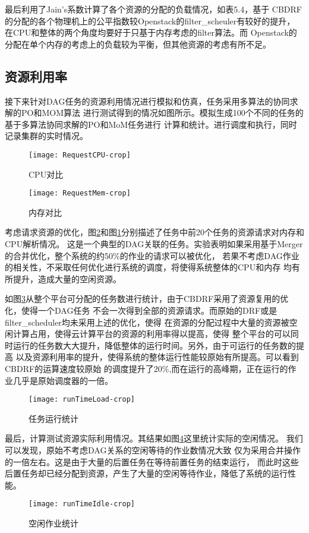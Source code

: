 最后利用了Jain's系数计算了各个资源的分配的负载情况，如表5.4，基于
CBDRF的分配的各个物理机上的公平指数较Openstack的filter\_scheuler有较好的提升，
在CPU和整体的两个角度均要好于只基于内存考虑的filter算法。而
Openstack的分配在单个内存的考虑上的负载较为平衡，但其他资源的考虑有所不足。
\subsection{资源利用率}
接下来针对DAG任务的资源利用情况进行模拟和仿真，任务采用多算法的协同求解的PO和MOM算法
进行测试得到的情况如图所示。模拟生成100个不同的任务的基于多算法协同求解的PO和MoM任务进行
计算和统计。进行调度和执行，同时记录集群的实时情况。
\begin{figure}[htbp]
\centering\texttt{[image: RequestCPU-crop]}
\caption{CPU对比}\label{fig:RequestCPU}
\end{figure}
\begin{figure}[htbp]
\centering\texttt{[image: RequestMem-crop]}
\caption{内存对比}\label{fig:RequestMem}
\end{figure}

考虑请求资源的优化，图\ref{fig:RequestMem}和图\ref{fig:RequestCPU}分别描述了任务中前20个任务的资源请求对内存和CPU解析情况。
这是一个典型的DAG关联的任务。实验表明如果采用基于Merger的合并优化，整个系统的约50\%的作业的请求可以被优化，
若果不考虑DAG作业的相关性，不采取任何优化进行系统的调度，将使得系统整体的CPU和内存
均有所提升，造成大量的空闲资源。

如图\ref{fig:runTimeLoad}从整个平台可分配的任务数进行统计，由于CBDRF采用了资源复用的优化，使得一个DAG任务
不会一次得到全部的资源请求。而原始的DRF或是filter\_scheduler均未采用上述的优化，使得
在资源的分配过程中大量的资源被空闲计算占用，使得云计算平台的资源的利用率得以提高，使得
整个平台的可以同时运行的任务数大大提升，降低整体的运行时间。另外，由于可运行的任务数的提高
以及资源利用率的提升，使得系统的整体运行性能较原始有所提高。可以看到CBDRF的运算速度较原始
的调度提升了20\%,而在运行的高峰期，正在运行的作业几乎是原始调度器的一倍。
\begin{figure}[htbp]
\centering\texttt{[image: runTimeLoad-crop]}
\caption{任务运行统计}\label{fig:runTimeLoad}
\end{figure}

最后，计算测试资源实际利用情况。其结果如图\ref{fig:runTimeIdle}这里统计实际的空闲情况。
我们可以发现，原始不考虑DAG关系的空闲等待的作业数情况大致
仅为采用合并操作的一倍左右。这是由于大量的后置任务在等待前置任务的结束运行，
而此时这些后置任务却已经分配到资源，产生了大量的空闲等待作业，降低了系统的运行性能。
\begin{figure}[htbp]
\centering\texttt{[image: runTimeIdle-crop]}
\caption{空闲作业统计}\label{fig:runTimeIdle}
\end{figure}

